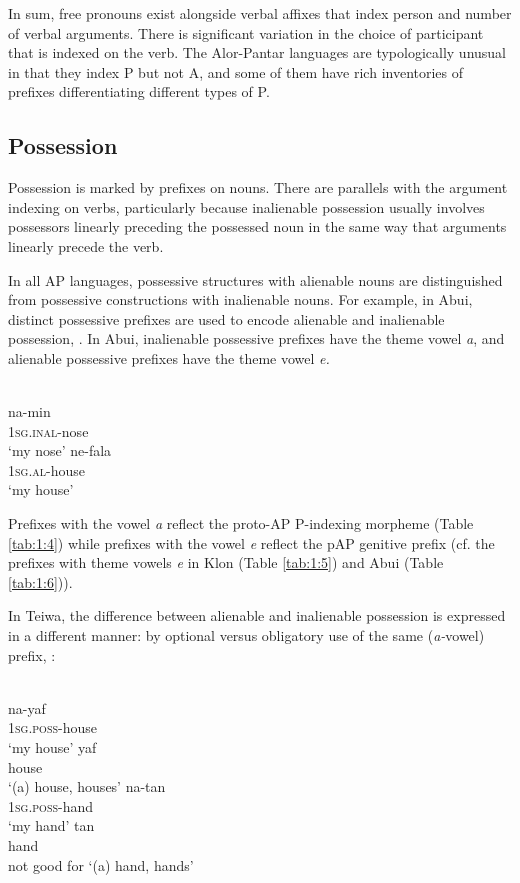 In sum, free pronouns exist alongside verbal affixes that index person and number of verbal arguments. There is significant variation in the choice of participant that is indexed on the verb. The Alor-Pantar languages are typologically unusual in that they index P but not A, and some of them have rich inventories of prefixes differentiating different types of P. 

\subsection{Possession}\label{sec:1:5.3}
Possession is marked by prefixes on nouns. There are parallels with the argument indexing on verbs, particularly because inalienable possession usually involves possessors linearly preceding the possessed noun in the same way that arguments linearly precede the verb. 

In all AP languages, possessive structures with alienable nouns are distinguished from possessive constructions with inalienable nouns. For example, in Abui, distinct possessive prefixes are used to encode alienable and inalienable possession, . In Abui, inalienable possessive prefixes have the theme vowel \textit{a}, and alienable possessive prefixes have the theme vowel \textit{e.}



\ea%
\label{ex:1:22}
 \\
\ea
\gll na-min \\
 1\textsc{sg.inal}{}-nose   \\
\glt `my nose'  
\ex
\gll ne-fala \\
  \textsc{1sg.al}{}-house     \\
\glt  `my house'  
\z
\z
 

Prefixes with the vowel \textit{a} reflect the proto-AP P-indexing morpheme (Table \ref{tab:1:4}) while prefixes with the vowel \textit{e} reflect the pAP genitive prefix (cf. the prefixes with theme vowels \textit{e} in Klon (Table \ref{tab:1:5}) and Abui (Table \ref{tab:1:6})). 

In Teiwa, the difference between alienable and inalienable possession is expressed in a different manner: by optional versus obligatory use of the same (\textit{a-}vowel) prefix, :



\ea%
\label{ex:1:23}
 \\
\ea
\gll na-yaf \\
  \textsc{1sg.poss-}house  \\
\glt `my house' 
\ex
\gll yaf \\
  house   \\
\glt    `(a) house, houses'
\ex
\gll na-tan \\
  \textsc{1sg.poss-}hand   \\
\glt `my hand' 
\ex
\gll tan \\
  hand \\
\glt  not good for `(a) hand, hands'
\z\z
 


